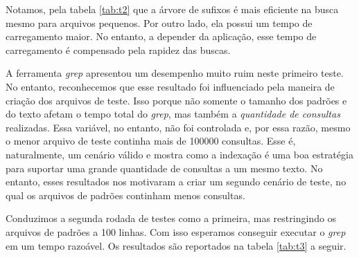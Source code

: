 \documentclass[]{article}
\begin{document}
Notamos, pela tabela \ref{tab:t2} que a árvore de sufixos é mais eficiente na busca mesmo para arquivos pequenos. Por outro lado, ela possui um tempo de carregamento maior. No entanto, a depender da aplicação, esse tempo de carregamento é compensado pela rapidez das buscas.

A ferramenta \textit{grep} apresentou um desempenho muito ruim neste primeiro teste. No entanto, reconhecemos que esse resultado foi influenciado pela maneira de criação dos arquivos de teste. Isso porque não somente o tamanho dos padrões e do texto afetam o tempo total do \textit{grep}, mas também a \textit{quantidade de consultas} realizadas. Essa variável, no entanto, não foi controlada e, por essa razão, mesmo o menor arquivo de teste continha mais de 100000 consultas. Esse é, naturalmente, um cenário válido e mostra como a indexação é uma boa estratégia para suportar uma grande quantidade de consultas a um mesmo texto. No entanto, esses resultados nos motivaram a criar um segundo cenário de teste, no qual os arquivos de padrões continham menos consultas. 

Conduzimos a segunda rodada de testes como a primeira, mas restringindo os arquivos de padrões a 100 linhas. Com isso esperamos conseguir executar o \textit{grep} em um tempo razoável. Os resultados são reportados na tabela \ref{tab:t3} a seguir.
\end{document}
